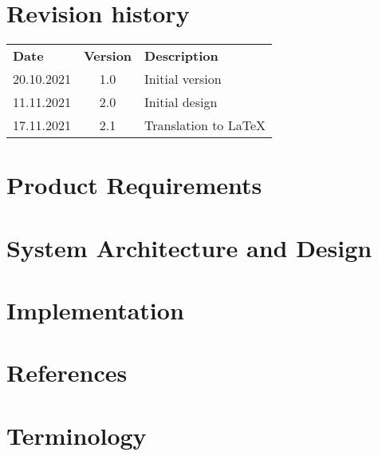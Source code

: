 \documentclass[hidelinks]{report}
\begin{document}
	\maketitle
	
	\chapter*{Revision history}
	
	\begin{table}[H]
		\centering
		\begin{tabularx}{\textwidth}{ l c X }
			\rowcolor[HTML]{C0C0C0}
			\textbf{Date} & \textbf{Version} & \textbf{Description} \\
			20.10.2021 & 1.0 & Initial version \\
			\rowcolor[HTML]{E7E7E7}
			11.11.2021 & 2.0 & Initial design \\
			17.11.2021 & 2.1 & Translation to LaTeX \\
		\end{tabularx}
	\end{table}
	
	\tableofcontents
	
	\chapter{Product Requirements}\label{chp:requirements}
	\thispagestyle{fancy}
	
	
	\chapter{System Architecture and Design}\label{chp:design}
	\thispagestyle{fancy}
	
	
	\chapter{Implementation}\label{chp:implementation}
	\thispagestyle{fancy}
	
	
	\chapter{References}\label{chp:references}
	\thispagestyle{fancy}
	
	
	\chapter{Terminology}\label{chp:terminology}
	\thispagestyle{fancy}
	
\end{document}
